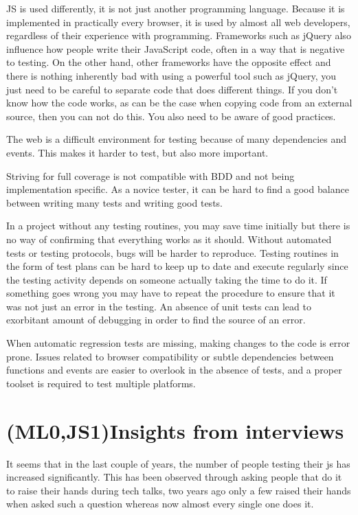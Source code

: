 \documentclass[11pt]{article}
\begin{document}
JS is used differently, it is not just another programming language. Because it is implemented in practically every browser, it is used by almost all web developers, regardless of their experience with programming. Frameworks such as jQuery also influence how people write their JavaScript code, often in a way that is negative to testing. On the other hand, other frameworks have the opposite effect and there is nothing inherently bad with using a powerful tool such as jQuery, you just need to be careful to separate code that does different things. If you don't know how the code works, as can be the case when copying code from an external source, then you can not do this. You also need to be aware of good practices.

The web is a difficult environment for testing because of many dependencies and events. This makes it harder to test, but also more important.

Striving for full coverage is not compatible with BDD and not being implementation specific. As a novice tester, it can be hard to find a good balance between writing many tests and writing good tests.

In a project without any testing routines, you may save time initially but there is no way of confirming that everything works as it should. Without automated tests or testing protocols, bugs will be harder to reproduce. Testing routines in the form of test plans can be hard to keep up to date and execute regularly since the testing activity depends on someone actually taking the time to do it. If something goes wrong you may have to repeat the procedure to ensure that it was not just an error in the testing. An absence of unit tests can lead to exorbitant amount of debugging in order to find the source of an error.

When automatic regression tests are missing, making changes to the code is error prone. Issues related to browser compatibility or subtle dependencies between functions and events are easier to overlook in the absence of tests, and a proper toolset is required to test multiple platforms.

\section{(ML0,JS1)Insights from interviews}

It seems that in the last couple of years, the number of people testing their \gls{js} has increased significantly\cite[question~1]{Edelstam}. This has been observed through asking people that do it to raise their hands during tech talks, two years ago only a few raised their hands when asked such a question whereas now almost every single one does it.
\end{document}
